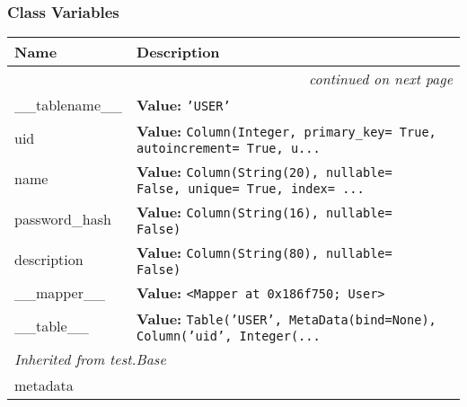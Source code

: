   \subsubsection{Class Variables}

    \vspace{-1cm}
\hspace{\varindent}\begin{longtable}{|p{\varnamewidth}|p{\vardescrwidth}|l}
\cline{1-2}
\cline{1-2} \centering \textbf{Name} & \centering \textbf{Description}& \\
\cline{1-2}
\endhead\cline{1-2}\multicolumn{3}{r}{\small\textit{continued on next page}}\\\endfoot\cline{1-2}
\endlastfoot\raggedright \_\-\_\-t\-a\-b\-l\-e\-n\-a\-m\-e\-\_\-\_\- & \raggedright \textbf{Value:} 
{\tt \texttt{'}\texttt{USER}\texttt{'}}&\\
\cline{1-2}
\raggedright u\-i\-d\- & \raggedright \textbf{Value:} 
{\tt Column(Integer, primary\_key= True, autoincrement= True, u\texttt{...}}&\\
\cline{1-2}
\raggedright n\-a\-m\-e\- & \raggedright \textbf{Value:} 
{\tt Column(String(20), nullable= False, unique= True, index= \texttt{...}}&\\
\cline{1-2}
\raggedright p\-a\-s\-s\-w\-o\-r\-d\-\_\-h\-a\-s\-h\- & \raggedright \textbf{Value:} 
{\tt Column(String(16), nullable= False)}&\\
\cline{1-2}
\raggedright d\-e\-s\-c\-r\-i\-p\-t\-i\-o\-n\- & \raggedright \textbf{Value:} 
{\tt Column(String(80), nullable= False)}&\\
\cline{1-2}
\raggedright \_\-\_\-m\-a\-p\-p\-e\-r\-\_\-\_\- & \raggedright \textbf{Value:} 
{\tt {\textless}Mapper at 0x186f750; User{\textgreater}}&\\
\cline{1-2}
\raggedright \_\-\_\-t\-a\-b\-l\-e\-\_\-\_\- & \raggedright \textbf{Value:} 
{\tt Table('USER', MetaData(bind=None), Column('uid', Integer(\texttt{...}}&\\
\cline{1-2}
\multicolumn{2}{|l|}{\textit{Inherited from test.Base}}\\
\multicolumn{2}{|p{\varwidth}|}{\raggedright metadata}\\
\cline{1-2}
\end{longtable}



